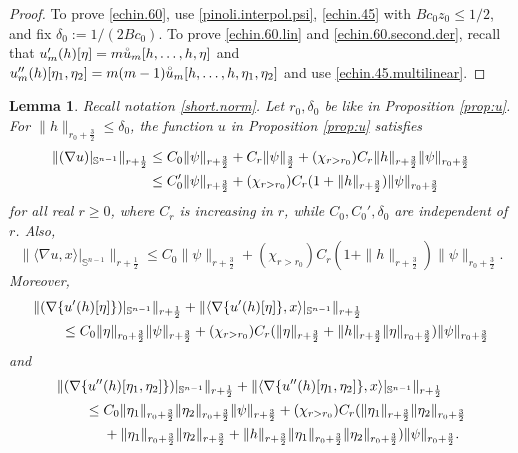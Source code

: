 \documentclass[10pt,reqno,a4paper]{article}
\numberwithin{equation}{section}
\theoremstyle{plain}
\newtheorem{lemma}[theorem]{Lemma}
\theoremstyle{definition}
\renewcommand{\S}{{\mathbb S}}
\newcommand{\la}{\langle}
\newcommand{\ra}{\rangle}
\newcommand{\grad}{\nabla}
\begin{document}
\begin{proof} 
To prove \eqref{echin.60}, use 
\eqref{pinoli.interpol.psi}, 
\eqref{echin.45} 
with $B c_0 z_0 \leq 1/2$,
and fix $\delta_0 := 1 / (2 B c_0)$. 
To prove \eqref{echin.60.lin} and \eqref{echin.60.second.der}, 
recall that 
$u_m'(h)[\eta] = m \accentset{\circ}{u}_m [h, \ldots, h, \eta]$ and  
$u_m''(h)[\eta_1, \eta_2] = m(m-1) \accentset{\circ}{u}_m [h, \ldots, h, \eta_1, \eta_2]$ 
and use \eqref{echin.45.multilinear}.
\end{proof}



\begin{lemma} \label{lemma:est.grad.u.x}
Recall notation \eqref{short.norm}. 
Let $r_0, \delta_0$ be like in Proposition \ref{prop:u}.
For $\| h \|_{r_0+\frac32} \leq \delta_0$, 
the function $u$ in Proposition \ref{prop:u} satisfies 
\begin{align} 
\| (\grad u)|_{\S^{n-1}} \|_{r+\frac12}
& \leq C_0 \| \psi \|_{r+\frac32} 
+ C_r \| \psi \|_{\frac32} 
+ (\chi_{r > r_0}) C_r \| h \|_{r+\frac32} 
\| \psi \|_{r_0+\frac32}
\notag \\ 
& \leq C_0' \| \psi \|_{r+\frac32} 
+ (\chi_{r > r_0}) C_r (1 + \| h \|_{r+\frac32}) \| \psi \|_{r_0+\frac32}
\label{echin.61}
\end{align}
for all real $r \geq 0$, 
where $C_r$ is increasing in $r$, 
while $C_0, C_0', \delta_0$ are independent of $r$.
Also, 
\begin{equation} \label{echin.62}
\| \la \grad u , x \ra|_{\S^{n-1}} \|_{r+\frac12} 
\leq C_0 \| \psi \|_{r+\frac32} 
+ (\chi_{r > r_0}) C_r (1 + \| h \|_{r+\frac32}) \| \psi \|_{r_0+\frac32}.
\end{equation}
Moreover, 
\begin{align} 
& \| (\grad \{ u'(h)[\eta] \})|_{\S^{n-1}} \|_{r+\frac12}
+ \| \la \grad \{ u'(h)[\eta] \} , x \ra|_{\S^{n-1}} \|_{r+\frac12}
\notag \\ 
& \qquad  
\leq C_0 \| \eta \|_{r_0+\frac32} \| \psi \|_{r+\frac32}
+ (\chi_{r > r_0}) C_r (\| \eta \|_{r+\frac32} 
+ \| h \|_{r+\frac32} \| \eta \|_{r_0+\frac32}) 
\| \psi \|_{r_0+\frac32}
\label{echin.61.lin}
\end{align}
and 
\begin{align}
& \| (\grad \{ u''(h)[\eta_1, \eta_2] \})|_{\S^{n-1}} \|_{r+\frac12}
+ \| \la \grad \{ u''(h)[\eta_1, \eta_2] \} , x \ra|_{\S^{n-1}} \|_{r+\frac12}
\notag \\ 
& \qquad 
\leq C_0 \| \eta_1 \|_{r_0+\frac32} \| \eta_2 \|_{r_0+\frac32} \| \psi \|_{r+\frac32}
+ (\chi_{r > r_0}) C_r 
(\| \eta_1 \|_{r+\frac32} \| \eta_2 \|_{r_0+\frac32}
\notag \\ & \qquad \quad \  
+ \| \eta_1 \|_{r_0+\frac32} \| \eta_2 \|_{r+\frac32}
+ \| h \|_{r+\frac32} \| \eta_1 \|_{r_0+\frac32} \| \eta_2 \|_{r_0+\frac32}  )
\| \psi \|_{r_0+\frac32}.
\label{echin.61.second.der}
\end{align}
\end{lemma}
\end{document}
